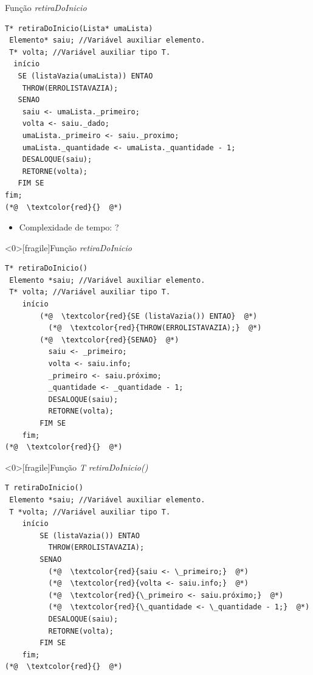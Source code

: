 \documentclass[12pt,table,xcolor={dvipsnames}]{beamer}
\begin{document}
\begin{frame}[fragile]{Função \textit{retiraDoInicio}}
\begin{lstlisting}
T* retiraDoInicio(Lista* umaLista)
 Elemento* saiu; //Variável auxiliar elemento.
 T* volta; //Variável auxiliar tipo T.
  início
   SE (listaVazia(umaLista)) ENTAO
    THROW(ERROLISTAVAZIA);
   SENAO
    saiu <- umaLista._primeiro;
    volta <- saiu._dado;
    umaLista._primeiro <- saiu._proximo;
    umaLista._quantidade <- umaLista._quantidade - 1;
    DESALOQUE(saiu);
    RETORNE(volta);
   FIM SE
fim;
(*@  \textcolor{red}{}  @*)
\end{lstlisting}
\begin{itemize}
	\item Complexidade de tempo: ?
\end{itemize}
\end{frame}

\begin{frame}<0>[fragile]{Função \textit{retiraDoInicio}}
\begin{lstlisting}
T* retiraDoInicio()
 Elemento *saiu; //Variável auxiliar elemento.
 T* volta; //Variável auxiliar tipo T.
	início
		(*@  \textcolor{red}{SE (listaVazia()) ENTAO}  @*)
		  (*@  \textcolor{red}{THROW(ERROLISTAVAZIA);}  @*)
		(*@  \textcolor{red}{SENAO}  @*)
		  saiu <- _primeiro;
		  volta <- saiu.info;
		  _primeiro <- saiu.próximo;
		  _quantidade <- _quantidade - 1;
		  DESALOQUE(saiu);
		  RETORNE(volta);
		FIM SE
	fim;
(*@  \textcolor{red}{}  @*)
\end{lstlisting}
\end{frame}

\begin{frame}<0>[fragile]{Função \textit{T retiraDoInicio()}}
\begin{lstlisting}
T retiraDoInicio()
 Elemento *saiu; //Variável auxiliar elemento.
 T *volta; //Variável auxiliar tipo T.
	início
		SE (listaVazia()) ENTAO
		  THROW(ERROLISTAVAZIA);
		SENAO
		  (*@  \textcolor{red}{saiu <- \_primeiro;}  @*)
		  (*@  \textcolor{red}{volta <- saiu.info;}  @*)
		  (*@  \textcolor{red}{\_primeiro <- saiu.próximo;}  @*)
		  (*@  \textcolor{red}{\_quantidade <- \_quantidade - 1;}  @*)
		  DESALOQUE(saiu);
		  RETORNE(volta);
		FIM SE
	fim;
(*@  \textcolor{red}{}  @*)
\end{lstlisting}
\end{frame}
\end{document}
